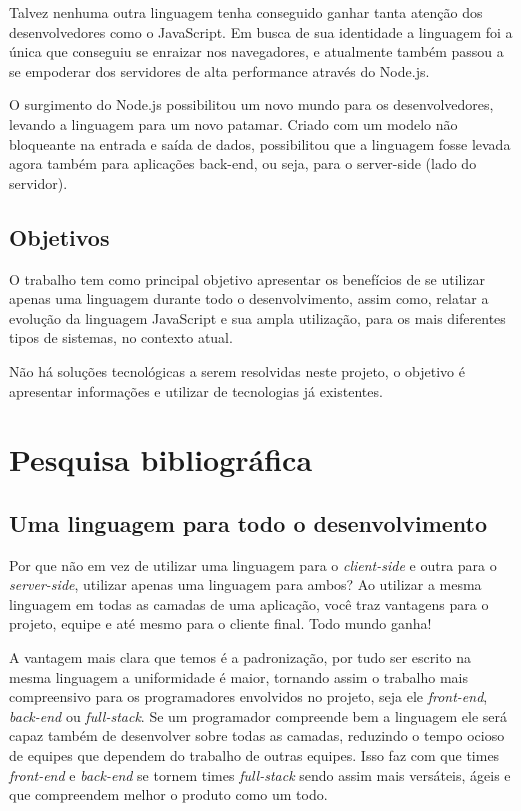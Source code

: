 \documentclass[
	12pt,				%
	openright,			%
	twoside,			%
	a4paper,			%
	english,			%
	brazil				%
	]{abntex2}
\begin{document}
Talvez nenhuma outra linguagem tenha conseguido ganhar tanta atenção dos desenvolvedores como o JavaScript. Em busca de  sua identidade a linguagem foi a única que conseguiu se enraizar nos navegadores, e atualmente também passou a se empoderar dos servidores de alta performance através do Node.js.

O surgimento do Node.js possibilitou um novo mundo para os desenvolvedores,
levando a linguagem para um novo patamar. Criado com um modelo não bloqueante na
entrada e saída de dados, possibilitou que a linguagem fosse levada agora também para
aplicações back-end, ou seja, para o server-side (lado do servidor).

\section{Objetivos}

O trabalho tem como principal objetivo apresentar os benefícios de se utilizar apenas uma linguagem durante todo o desenvolvimento, assim como, relatar a evolução da linguagem JavaScript e sua ampla utilização, para os mais diferentes tipos de sistemas, no contexto atual.

Não há soluções tecnológicas a serem resolvidas neste projeto, o objetivo é apresentar informações e utilizar de tecnologias já existentes.

\chapter{Pesquisa bibliográfica}

\section{Uma linguagem para todo o desenvolvimento}
\label{sec:UmaLinguagemDesenvolvimento}

Por que não em vez de utilizar uma linguagem para o \textit{client-side} e outra para o \textit{server-side}, utilizar apenas uma linguagem para ambos? Ao utilizar a mesma linguagem em todas as camadas de uma aplicação, você traz vantagens para o projeto, equipe e até mesmo para o cliente final. Todo mundo ganha!

A vantagem mais clara que temos é a padronização, por tudo ser escrito na mesma linguagem a uniformidade é maior, tornando assim o trabalho mais compreensivo para os programadores envolvidos no projeto, seja ele \textit{front-end}, \textit{back-end} ou \textit{full-stack}. Se um programador compreende bem a linguagem ele será capaz também de desenvolver sobre todas as camadas, reduzindo o tempo ocioso de equipes que dependem do trabalho de outras equipes. Isso faz com que times \textit{front-end} e \textit{back-end} se tornem times \textit{full-stack} sendo assim mais versáteis, ágeis e que compreendem melhor o produto como um todo.
\end{document}

